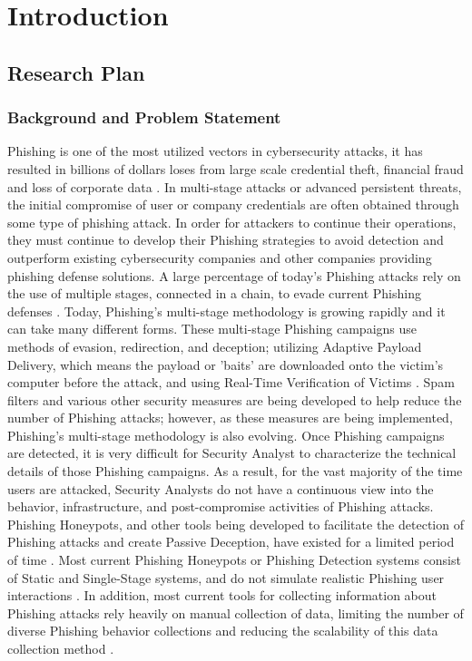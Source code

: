 
\chapter{Introduction}\label{cap:intro}


\section{Research Plan}

\subsection{Background and Problem Statement}
Phishing is one of the most utilized vectors in cybersecurity attacks, it has resulted in billions of dollars loses from large scale credential theft, financial fraud and loss of corporate data \cite{Leita2008Phishing,Mokube2007Honeypots}. In multi-stage attacks or advanced persistent threats, the initial compromise of user or company credentials are often obtained through some type of phishing attack.
In order for attackers to continue their operations, they must continue to develop their Phishing strategies to avoid detection and outperform existing cybersecurity companies and other companies providing phishing defense solutions. A large percentage of today's Phishing attacks rely on the use of multiple stages, connected in a chain, to evade current Phishing defenses \cite{Ramachandran2006FastFlux}. Today, Phishing's multi-stage methodology is growing rapidly and it can take many different forms. These multi-stage Phishing campaigns use methods of evasion, redirection, and deception; utilizing Adaptive Payload Delivery, which means the payload or 'baits' are downloaded onto the victim's computer before the attack, and using Real-Time Verification of Victims \cite{Leita2008Phishing}. Spam filters and various other security measures are being developed to help reduce the number of Phishing attacks; however, as these measures are being implemented, Phishing's multi-stage methodology is also evolving. Once Phishing campaigns are detected, it is very difficult for Security Analyst to characterize the technical details of those Phishing campaigns. As a result, for the vast majority of the time users are attacked, Security Analysts do not have a continuous view into the behavior, infrastructure, and post-compromise activities of Phishing attacks. Phishing Honeypots, and other tools being developed to facilitate the detection of Phishing attacks and create Passive Deception, have existed for a limited period of time \cite{Moric2025Honeypots}. Most current Phishing Honeypots or Phishing Detection systems consist of Static and Single-Stage systems, and do not simulate realistic Phishing user interactions \cite{Provos2004ClientHoneypots}. In addition, most current tools for collecting information about Phishing attacks rely heavily on manual collection of data, limiting the number of diverse Phishing behavior collections and reducing the scalability of this data collection method \cite{Bringer2012HoneypotSurvey}.


